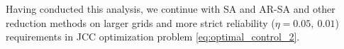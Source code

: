 %
%
Having conducted this analysis, we continue with SA and AR-SA and other reduction methods on larger grids and more strict reliability ($\eta = 0.05, ~0.01$) requirements in JCC optimization problem \eqref{eq:optimal_control_2}.
\vspace{-1mm}
